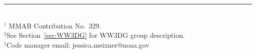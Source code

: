 \vfill

\noindent \rule{140mm}{0.5mm} \\
{\small $^\dag$ MMAB Contribution No.~329. \\
$^\ddag$See Section~\ref{sec:WW3DG} for WW3DG group description.\\
$^\ddag$Code manager email: jessica.meixner@noaa.gov}

\bpage

\pb

\pagestyle{myheadings}
\setcounter{page}{1}
\tableofcontents

\pb
\pagestyle{empty}
\bpagea

\pb
\pagestyle{myheadings}


